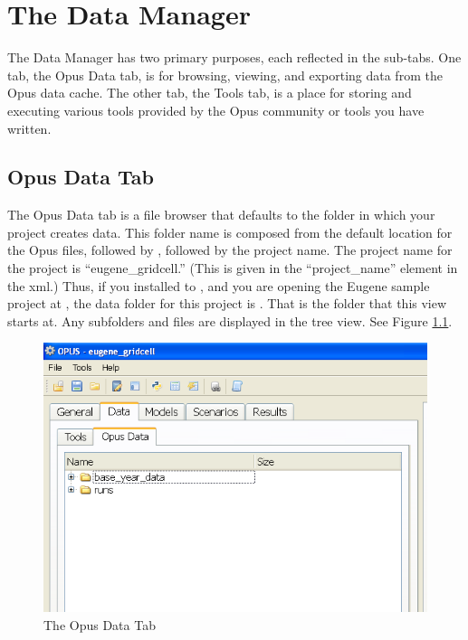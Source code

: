\chapter{The Data Manager}
The Data Manager has two primary purposes, each reflected in the sub-tabs.  One tab, the Opus Data 
tab, is for browsing, viewing, and exporting data from the Opus data cache.  
The other tab, the Tools tab, is a place for storing and executing various tools provided by the Opus community or tools you have written.

\section{Opus Data Tab}

The Opus Data tab is a file browser that defaults to the folder in which
your project creates data.  This folder name is composed from the default 
location for the Opus files, followed by , followed by the project
name.  The project name for the  project is
``eugene\_gridcell.'' (This is given in the ``project\_name'' element in the xml.)
Thus, if you installed to
, and you are opening the Eugene sample project at
, the data folder
for this project is .  That is the
folder that this view starts at.  Any subfolders and files are displayed in
the tree view.  See Figure \ref{fig:opusdatatab}.

\begin{figure}[htp]
\begin{center}
\includegraphics[scale=0.6]{part-gui/images/data-manager-opus-data-tab.png}
\end{center}
\caption{The Opus Data Tab}
\label{fig:opusdatatab}
\end{figure}

